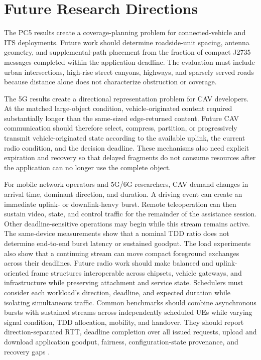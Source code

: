 \section{Future Research Directions}
\label{sec:future-directions}

The PC5 results create a coverage-planning problem for connected-vehicle and
ITS deployments. Future work should determine roadside-unit spacing, antenna
geometry, and supplemental-path placement from the fraction of compact J2735
messages completed within the application deadline. The evaluation must include urban intersections,
high-rise street canyons, highways, and sparsely served roads because distance
alone does not characterize obstruction or coverage.

The 5G results create a directional representation problem for CAV developers.
At the matched large-object condition, vehicle-originated content required
substantially longer than the same-sized edge-returned content. Future CAV
communication should therefore select, compress, partition, or progressively
transmit vehicle-originated state according to the available uplink, the
current radio condition, and the decision deadline. These mechanisms also need
explicit expiration and recovery so that delayed fragments do not consume
resources after the application can no longer use the complete object.

For mobile network operators and 5G/6G researchers, CAV demand changes in
arrival time, dominant direction, and duration. A driving event can create an
immediate uplink- or downlink-heavy burst. Remote teleoperation can then sustain
video, state, and control traffic for the remainder of the assistance session.
Other deadline-sensitive operations may begin while this stream remains
active. The same-device measurements show that a nominal TDD ratio does not
determine end-to-end burst latency or sustained goodput. The load experiments
also show that a continuing stream can move compact foreground exchanges across
their deadlines. Future radio work should make balanced and uplink-oriented
frame structures interoperable across chipsets, vehicle gateways, and
infrastructure while preserving attachment and service state. Schedulers must
consider each workload's direction, deadline, and expected duration while
isolating simultaneous traffic. Common benchmarks should combine asynchronous
bursts with sustained streams across independently scheduled UEs while varying
signal condition, TDD allocation, mobility, and handover. They should report
direction-separated RTT, deadline completion over all issued requests, upload
and download application goodput, fairness, configuration-state provenance,
and recovery gaps
\cite{ngmn2021tdd,itu2023m2160}.

